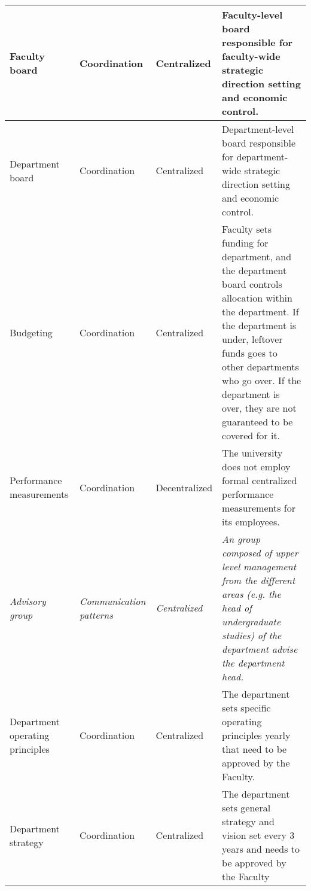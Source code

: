 \begin{table}[H]
\begin{tabular}{ | p{} | p{}| p{} | p{}|}
 Faculty board &
 Coordination &
 Centralized &
 Faculty-level board responsible for faculty-wide strategic direction setting and economic control. \\
%
\hline
%
%
 Department board &
 Coordination &
 Centralized &
 Department-level board responsible for department-wide strategic direction setting and economic control. \\
%
\hline
%
 Budgeting &
 Coordination &
 Centralized &
 Faculty sets funding for department, and the department board controls allocation within the department. If the department is under, leftover funds goes to other departments who go over. If the department is over, they are not guaranteed to be covered for it. \\
%
\hline
%
%
 Performance measurements &
 Coordination &
 Decentralized &
 The university does not employ formal centralized performance measurements for its employees.  \\
%
\hline
%
 \textit{Advisory group} &
 \textit{Communication patterns} &
 \textit{Centralized} &
 \textit{An group composed of upper level management from the different areas (e.g. the head of undergraduate studies) of the department advise the department head.} \\
%
\hline
%
%
 Department operating principles &
 Coordination &
 Centralized &
 The department sets specific operating principles  yearly that need to be approved by the Faculty. \\
%
\hline
%
%
 Department strategy &
 Coordination &
 Centralized &
 The department sets general strategy and vision set every 3 years and needs to be approved by the Faculty \\
%
\hline

\end{tabular}
\end{table}

